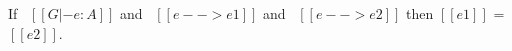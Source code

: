 \begin{theorem}[Determinism]
\label{lemma:union:rev:simpl:determinism}
  If \ $[[G |- e : A]]$ and \ $[[e --> e1]]$ and \ $[[e --> e2]]$ then $[[e1]]$ = $[[e2]]$.
\end{theorem}



















